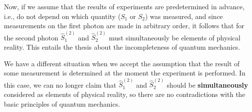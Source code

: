 Now, if we assume that the results of experiments
are predetermined in advance, i.e., do not depend on which
quantity ($S_1$ or $S_2$) was measured, and since measurements on
the first photon are made in arbitrary order, it follows that for the second photon
$\hat{S}^{(2)}_1$ and
$\hat{S}^{(2)}_2$ must simultaneously be elements of physical
reality. This entails the thesis about the incompleteness of quantum mechanics.

We have a different situation when we accept the assumption that
the result of some measurement is determined at the moment the
experiment is performed. In this case, we can no longer claim that 
$\hat{S}_1^{(2)}$ and $\hat{S}_2^{(2)}$ should be {\bf simultaneously}
considered as elements of physical reality, so there are no
contradictions with the basic principles of quantum mechanics.



